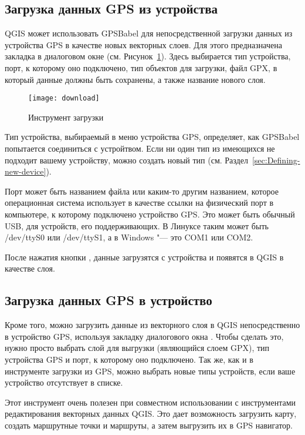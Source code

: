 \subsection{Загрузка данных GPS из устройства}

QGIS может использовать GPSBabel для непосредственной загрузки данных из
устройства GPS в качестве новых векторных слоев. Для этого предназначена
закладка  в диалоговом окне 
(см. Рисунок~\ref{figure_download}). Здесь выбирается тип устройства,
порт, к которому оно подключено, тип объектов для загрузки, файл GPX, в
который данные должны быть сохранены, а также название нового слоя.

\begin{figure}[ht]
   \centering
   \texttt{[image: download]}
   \caption{Инструмент загрузки \nixcaption}\label{figure_download}
\end{figure}

Тип устройства, выбираемый в меню устройства GPS, определяет, как
GPSBabel попытается соединиться с устройтвом. Если ни один тип из
имеющихся не подходит вашему устройству, можно создать новый тип
(см. Раздел~\ref{sec:Defining-new-device}).

Порт может быть названием файла или каким-то другим названием, которое
операционная система использует в качестве ссылки на физический порт в
компьютере, к которому подключено устройство GPS. Это может быть
обычный USB, для устройств, его поддерживающих.
\nix В Линуксе таким может быть /dev/ttyS0 или /dev/ttyS1, а в
\win Windows "--- это COM1 или COM2.

После нажатия кнопки , данные загрузятся с устройства и
появятся в QGIS в качестве слоя.

\subsection{Загрузка данных GPS в устройство}

Кроме того, можно загрузить данные из векторного слоя в QGIS
непосредственно в устройство GPS, используя закладку 
диалогового окна . Чтобы сделать это, нужно просто
выбрать слой для выгрузки (являющийся слоем GPX), тип устройства GPS и
порт, к которому оно подключено. Так же, как и в инструменте загрузки
из GPS, можно выбрать новые типы устройств, если ваше устройство
отсутствует в списке.

Этот инструмент очень полезен при совместном использовании с
инструментами редактирования векторных данных QGIS. Это дает возможность
загрузить карту, создать маршрутные точки и маршруты, а затем выгрузить
их в GPS навигатор.


